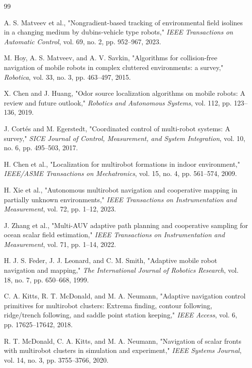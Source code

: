 \documentclass[lettersize,journal]{IEEEtran}
\begin{document}
\begin{thebibliography}{99}

 A. S. Matveev et al., "Nongradient-based tracking of environmental field isolines in a changing medium by dubins-vehicle type robots," \textit{IEEE Transactions on Automatic Control}, vol. 69, no. 2, pp. 952--967, 2023.

 M. Hoy, A. S. Matveev, and A. V. Savkin, "Algorithms for collision-free navigation of mobile robots in complex cluttered environments: a survey," \textit{Robotica}, vol. 33, no. 3, pp. 463--497, 2015.

 X. Chen and J. Huang, "Odor source localization algorithms on mobile robots: A review and future outlook," \textit{Robotics and Autonomous Systems}, vol. 112, pp. 123--136, 2019.

 J. Cortés and M. Egerstedt, "Coordinated control of multi-robot systems: A survey," \textit{SICE Journal of Control, Measurement, and System Integration}, vol. 10, no. 6, pp. 495--503, 2017.

 H. Chen et al., "Localization for multirobot formations in indoor environment," \textit{IEEE/ASME Transactions on Mechatronics}, vol. 15, no. 4, pp. 561--574, 2009.

 H. Xie et al., "Autonomous multirobot navigation and cooperative mapping in partially unknown environments," \textit{IEEE Transactions on Instrumentation and Measurement}, vol. 72, pp. 1--12, 2023.

 J. Zhang et al., "Multi-AUV adaptive path planning and cooperative sampling for ocean scalar field estimation," \textit{IEEE Transactions on Instrumentation and Measurement}, vol. 71, pp. 1--14, 2022.

 H. J. S. Feder, J. J. Leonard, and C. M. Smith, "Adaptive mobile robot navigation and mapping," \textit{The International Journal of Robotics Research}, vol. 18, no. 7, pp. 650--668, 1999.

 C. A. Kitts, R. T. McDonald, and M. A. Neumann, "Adaptive navigation control primitives for multirobot clusters: Extrema finding, contour following, ridge/trench following, and saddle point station keeping," \textit{IEEE Access}, vol. 6, pp. 17625--17642, 2018.

 R. T. McDonald, C. A. Kitts, and M. A. Neumann, "Navigation of scalar fronts with multirobot clusters in simulation and experiment," \textit{IEEE Systems Journal}, vol. 14, no. 3, pp. 3755--3766, 2020.


\end{thebibliography}
\end{document}
